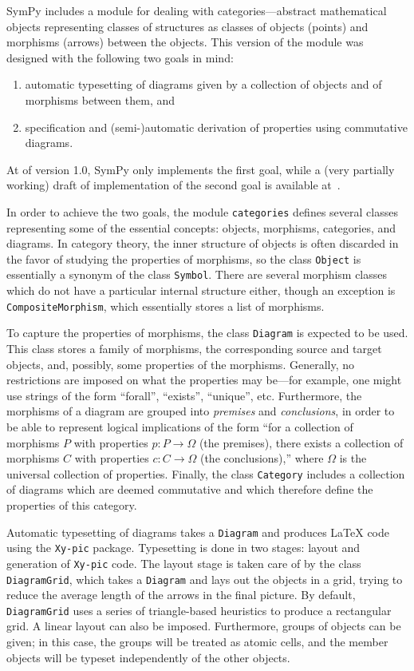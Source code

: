 SymPy includes a module for dealing with categories---abstract mathematical
objects representing classes of structures as classes of objects (points) and
morphisms (arrows) between the objects. This version of the module was
designed with the following two goals in mind:

\begin{enumerate}
\item automatic typesetting of diagrams given by a collection of
  objects and of morphisms between them, and
\item specification and (semi-)automatic derivation of properties
  using commutative diagrams.
\end{enumerate}

At of version 1.0, SymPy only implements the first goal, while a (very partially
working) draft of implementation of the second goal is available
at~\cite{ct4commutativity}.

In order to achieve the two goals, the module \texttt{categories} defines
several classes representing some of the essential concepts: objects, morphisms,
categories, and diagrams.  In category theory, the inner structure of objects is
often discarded in the favor of studying the properties of morphisms, so the
class \texttt{Object} is essentially a synonym of the class \texttt{Symbol}.
There are several morphism classes which do not have a particular internal
structure either, though an exception is \texttt{CompositeMorphism}, which
essentially stores a list of morphisms.

To capture the properties of morphisms, the class \texttt{Diagram} is expected
to be used.  This class stores a family of morphisms, the corresponding source
and target objects, and, possibly, some properties of the morphisms.  Generally,
no restrictions are imposed on what the properties may be---for example, one
might use strings of the form ``forall'', ``exists'', ``unique'', etc.
Furthermore, the morphisms of a diagram are grouped into \textit{premises} and
\textit{conclusions}, in order to be able to represent logical implications of
the form ``for a collection of morphisms $P$ with properties $p:P\to \Omega$ (the
premises), there exists a collection of morphisms $C$ with properties $c:C\to
\Omega$ (the conclusions),'' where $\Omega$ is the universal collection of
properties.  Finally, the class \texttt{Category} includes a collection of
diagrams which are deemed commutative and which therefore define the properties
of this category.

Automatic typesetting of diagrams takes a \texttt{Diagram} and produces \LaTeX{}
code using the \texttt{Xy-pic} package.  Typesetting is done in two stages:
layout and generation of \texttt{Xy-pic} code.  The layout stage is taken care
of by the class \texttt{DiagramGrid}, which takes a \texttt{Diagram} and lays out
the objects in a grid, trying to reduce the average length of the arrows in the
final picture.  By default, \texttt{DiagramGrid} uses a series of triangle-based
heuristics to produce a rectangular grid.  A linear layout can also be imposed.
Furthermore, groups of objects can be given; in this case, the groups will be
treated as atomic cells, and the member objects will be typeset independently of
the other objects.

